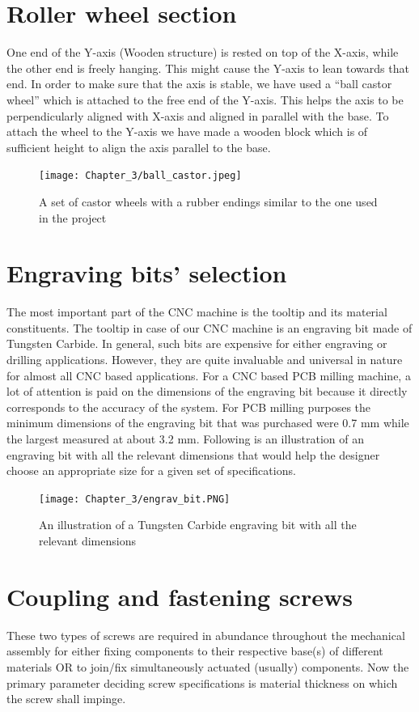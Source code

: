 \section{Roller wheel section}

One end of the Y-axis (Wooden structure) is rested on top of the X-axis, while the other end is freely hanging. This might cause the Y-axis to lean towards that end. In order to make sure that the axis is stable, we have used a “ball castor wheel” which is attached to the free end of the Y-axis. This helps the axis to be perpendicularly aligned with X-axis and aligned in parallel with the base. To attach the wheel to the Y-axis we have made a wooden block which is of sufficient height to align the axis parallel to the base.

\begin{figure}[h]
 \centering
 \texttt{[image: Chapter\_3/ball\_castor.jpeg]}
 \caption{A set of castor wheels with a rubber endings similar to the one used in the project}
 \label{fig:ballcastor}
\end{figure}

\section{Engraving bits' selection}

The most important part of the CNC machine is the tooltip and its material constituents. The tooltip in case of our CNC machine is an engraving bit made of Tungsten Carbide. In general, such bits are expensive for either engraving or drilling applications. However, they are quite invaluable and universal in nature for almost all CNC based applications. For a CNC based PCB milling machine, a lot of attention is paid on the dimensions of the engraving bit because it directly corresponds to the accuracy of the system. For PCB milling purposes the minimum dimensions of the engraving bit that was purchased were 0.7 mm while the largest measured at about 3.2 mm. Following is an illustration of an engraving bit with all the relevant dimensions that would help the designer choose an appropriate size for a given set of specifications.

\begin{figure}[h]
 \centering
 \texttt{[image: Chapter\_3/engrav\_bit.PNG]}
 \caption{An illustration of a Tungsten Carbide engraving bit with all the relevant dimensions}
 \label{fig:ebit}
\end{figure}

\section{Coupling and fastening screws} \label{screws}
These two types of screws are required in abundance throughout the mechanical assembly for either fixing components to their respective base(s) of different materials OR to join/fix simultaneously actuated (usually) components. Now the primary parameter deciding screw specifications is material thickness on which the screw shall impinge. \par


